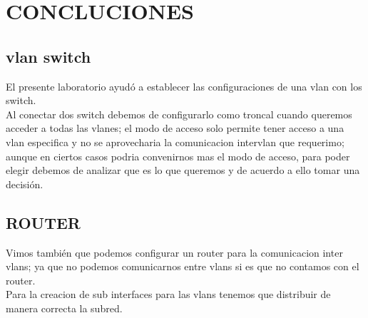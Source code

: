 \chapter{CONCLUCIONES}

  \section{vlan switch}

\begin{caja}[]{
El presente laboratorio ayud\'o a establecer las configuraciones de una vlan con los switch.
\\ Al conectar dos switch debemos de configurarlo como troncal cuando queremos acceder a todas las vlanes; el modo de acceso solo permite tener acceso a una vlan especifica y no se aprovecharia la comunicacion intervlan que requerimo; aunque en ciertos casos podria convenirnos mas el modo de acceso, para poder elegir debemos de analizar que es lo que queremos y de acuerdo a ello tomar una decisi\'on.
 }\end{caja}
 
   \section{ROUTER}

\begin{caja}[]{
Vimos tambi\'en que podemos configurar un router para la comunicacion inter vlans; ya que no podemos comunicarnos entre vlans si es que no contamos con el router.
\\Para la creacion de sub interfaces para las vlans tenemos que distribuir de manera correcta la subred.
 }\end{caja}